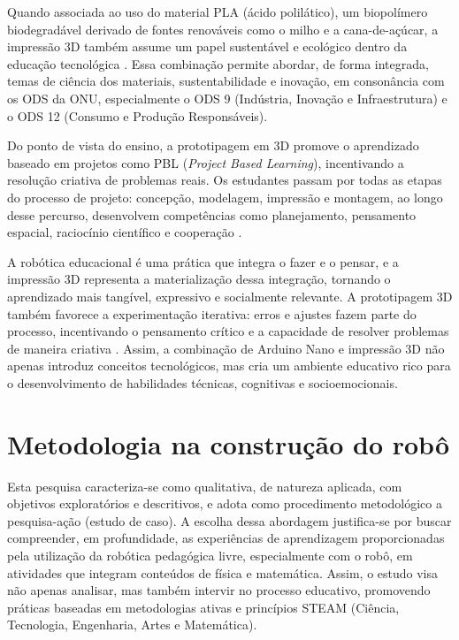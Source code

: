 \documentclass[portuguese]{textolivre}
\begin{document}
Quando associada ao uso do material PLA (ácido polilático), um biopolímero biodegradável derivado de fontes renováveis como o milho e a cana-de-açúcar, a impressão 3D também assume um papel sustentável e ecológico dentro da educação tecnológica \cite{ref22}. Essa combinação permite abordar, de forma integrada, temas de ciência dos materiais, sustentabilidade e inovação, em consonância com os ODS da ONU, especialmente o ODS 9 (Indústria, Inovação e Infraestrutura) e o ODS 12 (Consumo e Produção Responsáveis). 

Do ponto de vista do ensino, a prototipagem em 3D promove o aprendizado baseado em projetos como PBL (\textit{Project Based Learning}), incentivando a resolução criativa de problemas reais. Os estudantes passam por todas as etapas do processo de projeto: concepção, modelagem, impressão e montagem, ao longo desse percurso, desenvolvem competências como planejamento, pensamento espacial, raciocínio científico e cooperação \cite{ref19,ref20,ref21}.

A robótica educacional é uma prática que integra o fazer e o pensar, e a impressão 3D representa a materialização dessa integração, tornando o aprendizado mais tangível, expressivo e socialmente relevante. A prototipagem 3D também favorece a experimentação iterativa: erros e ajustes fazem parte do processo, incentivando o pensamento crítico e a capacidade de resolver problemas de maneira criativa \cite{ref24}. Assim, a combinação de Arduino Nano e impressão 3D não apenas introduz conceitos tecnológicos, mas cria um ambiente educativo rico para o desenvolvimento de habilidades técnicas, cognitivas e socioemocionais.

\section{Metodologia na construção do robô}\label{sec-metodologia}

Esta pesquisa caracteriza-se como qualitativa, de natureza aplicada, com objetivos exploratórios e descritivos, e adota como procedimento metodológico a pesquisa-ação (estudo de caso). A escolha dessa abordagem justifica-se por buscar compreender, em profundidade, as experiências de aprendizagem proporcionadas pela utilização da robótica pedagógica livre, especialmente com o robô, em atividades que integram conteúdos de física e matemática. Assim, o estudo visa não apenas analisar, mas também intervir no processo educativo, promovendo práticas baseadas em metodologias ativas e princípios STEAM (Ciência, Tecnologia, Engenharia, Artes e Matemática).
\end{document}
